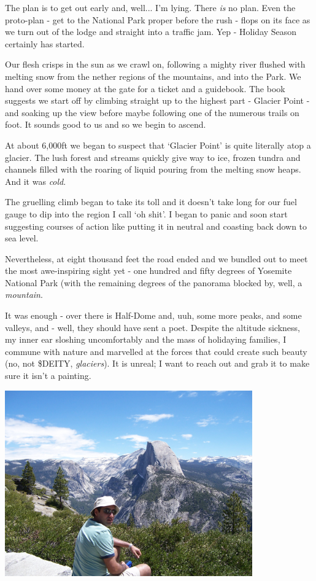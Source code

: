 \documentclass[a5paper,titlepage,11pt,draft]{book}
\begin{document}
The plan is to get out early and, well... I'm lying.  There \emph{is} no plan.  Even the proto-plan - get to the National Park proper before the rush - flops on its face as we turn out of the lodge and straight into a traffic jam.  Yep - Holiday Season certainly has started.

Our flesh crisps in the sun as we crawl on, following a mighty river flushed with melting snow from the nether regions of the mountains, and into the Park.  We hand over some money at the gate for a ticket and a guidebook.  The book suggests we start off by climbing straight up to the highest part - Glacier Point - and soaking up the view before maybe following one of the numerous trails on foot.  It sounds good to us and so we begin to ascend.

At about 6,000ft we began to suspect that `Glacier Point' is quite literally atop a glacier.  The lush forest and streams quickly give way to ice, frozen tundra and channels filled with the roaring of liquid pouring from the melting snow heaps.  And it was \emph{cold}.

The gruelling climb began to take its toll and it doesn't take long for our fuel gauge to dip into the region I call `oh shit'.  I began to panic and soon start suggesting courses of action like putting it in neutral and coasting back down to sea level.

Nevertheless, at eight thousand feet the road ended and we bundled out to meet the most awe-inspiring sight yet - one hundred and fifty degrees of Yosemite National Park (with the remaining degrees of the panorama blocked by, well, a \emph{mountain}.

It was enough - over there is Half-Dome and, uuh, some more peaks, and some valleys, and - well, they should have sent a poet.  Despite the altitude sickness, my inner ear sloshing uncomfortably and the mass of holidaying families, I commune with nature and marvelled at the forces that could create such beauty (no, not \$DEITY, \emph{glaciers}).  It is unreal; I want to reach out and grab it to make sure it isn't a painting.

\begin{center}\includegraphics[width=0.8\textwidth]{gfx/100_1213}\end{center}
\end{document}
